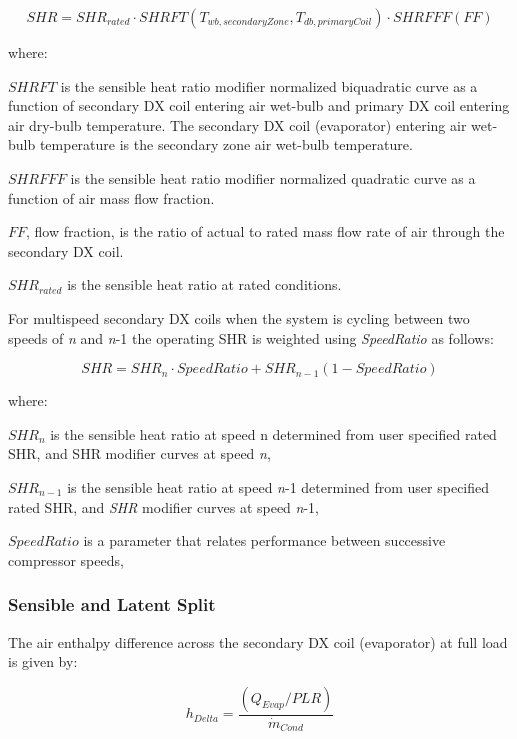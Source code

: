 \begin{equation}
SHR = SHR_{rated}\cdot SHRFT\left(T_{wb,secondaryZone},T_{db,primaryCoil}\right)\cdot SHRFFF(FF)
\end{equation}

where:

\(SHRFT\) is the sensible heat ratio modifier normalized biquadratic curve as a function of secondary DX coil entering air wet-bulb and primary DX coil entering air dry-bulb temperature. The secondary DX coil (evaporator) entering air wet-bulb temperature is the secondary zone air wet-bulb temperature.

\(SHRFFF\) is the sensible heat ratio modifier normalized quadratic curve as a function of air mass flow fraction.

\(FF\), flow fraction,  is the ratio of actual to rated mass flow rate of air through the secondary DX coil.

\(SHR_{rated}\) is the sensible heat ratio at rated conditions.

For multispeed secondary DX coils when the system is cycling between two speeds of \emph{n} and \emph{n}-1 the operating SHR is weighted using \emph{SpeedRatio} as follows:

\begin{equation}
SHR = SHR_n \cdot SpeedRatio +  SHR_{n-1} (1 - SpeedRatio)
\end{equation}

where:

\(SHR_n\) is the sensible heat ratio at speed n determined from user specified rated SHR, and SHR modifier curves at speed \emph{n},

\(SHR_{n-1}\) is the sensible heat ratio at speed \emph{n}-1 determined from user specified rated SHR, and \emph{SHR} modifier curves at speed \emph{n}-1,

\(SpeedRatio\) is a parameter that relates performance between successive compressor speeds,

\subsubsection{Sensible and Latent Split}\label{sensible-and-latent-split}

The air enthalpy difference across the secondary DX coil (evaporator) at full load is given by:

\begin{equation}
  h_{Delta} = \frac{\left(Q_{Evap}/PLR\right)}{\dot{m}_{Cond}}
\end{equation}

